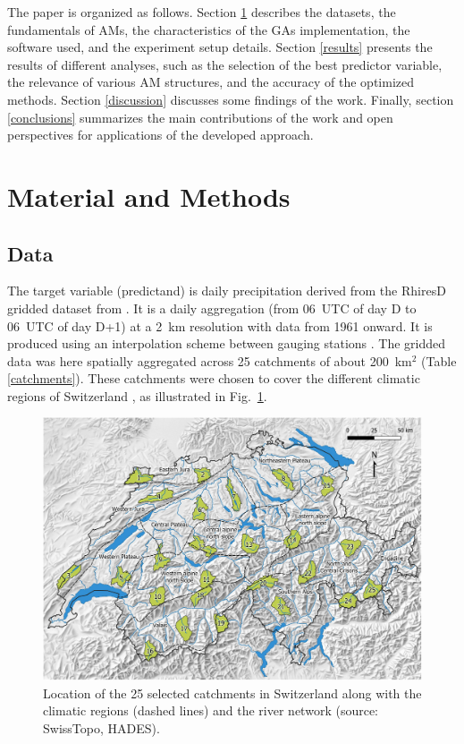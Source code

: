 \documentclass[draft]{agujournal2019}
\begin{document}
The paper is organized as follows. Section \ref{material_methods} describes the datasets, the fundamentals of AMs, the characteristics of the GAs implementation, the software used, and the experiment setup details. Section \ref{results} presents the results of different analyses, such as the selection of the best predictor variable, the relevance of various AM structures, and the accuracy of the optimized methods. Section \ref{discussion} discusses some findings of the work. Finally, section \ref{conclusions} summarizes the main contributions of the work and open perspectives for applications of the developed approach.


\section{Material and Methods}
\label{material_methods}

\subsection{Data}
\label{data}

The target variable (predictand) is daily precipitation derived from the RhiresD gridded dataset from . It is a daily aggregation (from 06~UTC of day D to 06~UTC of day D+1) at a 2~km resolution with data from 1961 onward. It is produced using an interpolation scheme between gauging stations \cite{Frei1998}. The gridded data was here spatially aggregated across 25 catchments of about 200~km$^2$ (Table \ref{catchments}). These catchments were chosen to cover the different climatic regions of Switzerland \cite{Schuepp1980}, as illustrated in Fig.~\ref{map}.


\begin{figure}[hbt]
	\noindent\includegraphics[width=140mm]{figures/map.jpg}
	\caption{Location of the 25 selected catchments in Switzerland along with the climatic regions (dashed lines) and the river network (source: SwissTopo, HADES).}
	\label{map}
\end{figure}
\end{document}

